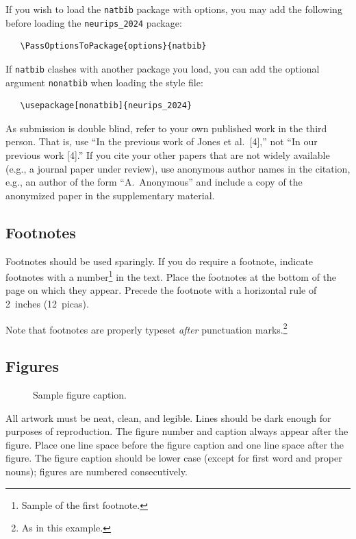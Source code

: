 \documentclass{article}
\begin{document}
If you wish to load the \verb+natbib+ package with options, you may add the
following before loading the \verb+neurips_2024+ package:
\begin{verbatim}
   \PassOptionsToPackage{options}{natbib}
\end{verbatim}


If \verb+natbib+ clashes with another package you load, you can add the optional
argument \verb+nonatbib+ when loading the style file:
\begin{verbatim}
   \usepackage[nonatbib]{neurips_2024}
\end{verbatim}


As submission is double blind, refer to your own published work in the third
person. That is, use ``In the previous work of Jones et al.\ [4],'' not ``In our
previous work [4].'' If you cite your other papers that are not widely available
(e.g., a journal paper under review), use anonymous author names in the
citation, e.g., an author of the form ``A.\ Anonymous'' and include a copy of the anonymized paper in the supplementary material.


\subsection{Footnotes}


Footnotes should be used sparingly.  If you do require a footnote, indicate
footnotes with a number\footnote{Sample of the first footnote.} in the
text. Place the footnotes at the bottom of the page on which they appear.
Precede the footnote with a horizontal rule of 2~inches (12~picas).


Note that footnotes are properly typeset \emph{after} punctuation
marks.\footnote{As in this example.}


\subsection{Figures}


\begin{figure}
  \centering
  \fbox{\rule[-.5cm]{0cm}{4cm} \rule[-.5cm]{4cm}{0cm}}
  \caption{Sample figure caption.}
\end{figure}


All artwork must be neat, clean, and legible. Lines should be dark enough for
purposes of reproduction. The figure number and caption always appear after the
figure. Place one line space before the figure caption and one line space after
the figure. The figure caption should be lower case (except for first word and
proper nouns); figures are numbered consecutively.
\end{document}
